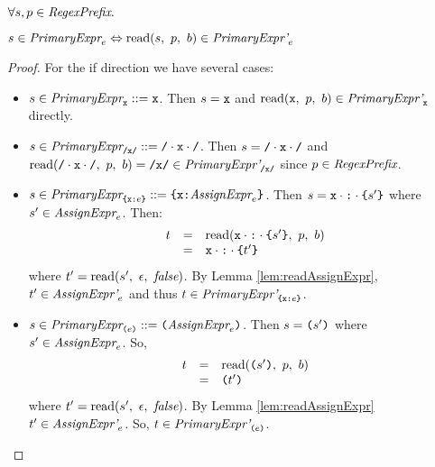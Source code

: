 \documentclass[preprint,10pt]{sigplanconf}
\begin{document}
\begin{lemma}\mbox{}
  
  \( \forall s, p \in \textit{RegexPrefix}. \)

  \( s \in \textit{PrimaryExpr}_{e} \Leftrightarrow 
  \textrm{read}(s,~p,~b) \in \textit{PrimaryExpr'}_{e} \)
\end{lemma}
\begin{proof}
  For the if direction we have several cases:
  \begin{itemize}
  \item \( s \in \textit{PrimaryExpr}_{\texttt{x}} ::= \texttt{x} \). Then \( s
    = \texttt{x} \) and \( \textrm{read}(\texttt{x},~p,~b) \in
    \textit{PrimaryExpr'}_{\texttt{x}} \) directly.

  \item \( s \in \textit{PrimaryExpr}_{\texttt{/x/}} ::= \texttt{/} \cdot \texttt{x} \cdot \texttt{/} \). Then \( s
    = \texttt{/} \cdot \texttt{x} \cdot \texttt{/} \) and \( \textrm{read}(\texttt{/} \cdot \texttt{x} \cdot \texttt{/},~p,~b) = \texttt{/x/} \in
    \textit{PrimaryExpr'}_{\texttt{/x/}} \) since \( p \in \textit{RegexPrefix} \).

  \item \( s \in \textit{PrimaryExpr}_{\texttt{\{}\texttt{x}\texttt{:}e\texttt{\}}}
    ::= \texttt{\{}\texttt{x}\texttt{:} \textit{AssignExpr}_{e}\texttt{\}} \).
    Then \( s = \texttt{x} \cdot \texttt{:} \cdot \texttt{\{}s'\texttt{\}} \) where \(
    s' \in \textit{AssignExpr}_{e} \). Then:
    \[
    \begin{array}{rcl}
      t &=& \textrm{read}(\texttt{x}\cdot  \texttt{:} \cdot \texttt{\{}s'\texttt{\}},~p,~b)
      \\
      &=& \texttt{x} \cdot \texttt{:} \cdot \texttt{\{}t'\texttt{\}}
    \end{array}
    \]
    where \( t' = \textrm{read}(s',~\epsilon,~\textit{false}) \). By Lemma
    \ref{lem:readAssignExpr}, \( t' \in
    \textit{AssignExpr'}_{e} \) and thus \( t \in
    \textit{PrimaryExpr'}_{\texttt{\{}\texttt{x}\texttt{:}e\texttt{\}}} \).
    
  \item \( s \in \textit{PrimaryExpr}_{\texttt{(}e\texttt{)}}
    ::= \texttt{(}\textit{AssignExpr}_{e}\texttt{)} \). Then \( s = \texttt{(}s'\texttt{)} \)
    where \( s' \in \textit{AssignExpr}_{e} \). So,
    \[
    \begin{array}{rcl}
      t &=& \textrm{read}(\texttt{(}s'\texttt{)},~p,~b)
      \\
      &=& \texttt{(}t'\texttt{)}
    \end{array}
    \]
    where \( t' = \textrm{read}(s',~\epsilon,~\textit{false}) \). By Lemma
    \ref{lem:readAssignExpr} \( t' \in
    \textit{AssignExpr'}_{e} \). So, \( t \in
    \textit{PrimaryExpr'}_{\texttt{(}e\texttt{)}} \).
  \end{itemize}
\end{proof}
\end{document}
